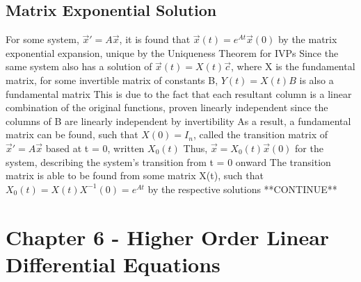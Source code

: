 \documentclass[11 pt, twoside]{article}
\newenvironment{outline*}
{
	\begin{outline}[enumerate]
	}
	{\end{outline}
}
\begin{document}
\subsection{Matrix Exponential Solution}
\begin{outline*}
\1 For some system, $\vec{x}' = A\vec{x}$, it is found that $\vec{x}(t) = e^{At}\vec{x}(0)$ by the matrix exponential expansion, unique by the Uniqueness Theorem for IVPs
\1 Since the same system also has a solution of $\vec{x}(t) = X(t)\vec{c}$, where X is the fundamental matrix, for some invertible matrix of constants B, $Y(t) = X(t)B$ is also a fundamental matrix
\2 This is due to the fact that each resultant column is a linear combination of the original functions, proven linearly independent since the columns of B are linearly independent by invertibility
\2 As a result, a fundamental matrix can be found, such that $X(0) = I_n$, called the transition matrix of $\vec{x}' = A\vec{x}$ based at t = 0, written $X_0(t)$
\3 Thus, $\vec{x} = X_0(t)\vec{x}(0)$ for the system, describing the system's transition from t = 0 onward
\3 The transition matrix is able to be found from some matrix X(t), such that $X_0(t) = X(t)X^{-1}(0) = e^{At}$ by the respective solutions
\1 **CONTINUE**
\end{outline*}
\section{Chapter 6 - Higher Order Linear Differential Equations}
\end{document}
